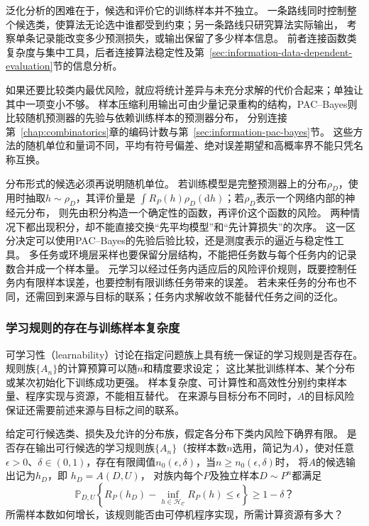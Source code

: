 泛化分析的困难在于，候选和评价它的训练样本并不独立。
一条路线同时控制整个候选类，使算法无论选中谁都受到约束；另一条路线只研究算法实际输出，
考察单条记录能改变多少预测损失，或输出保留了多少样本信息。
前者连接函数类复杂度与集中工具，后者连接算法稳定性及第~\ref{sec:information-data-dependent-evaluation}节的信息分析。

如果还要比较类内最优风险，就应将统计差异与未充分求解的代价合起来；单独让其中一项变小不够。
样本压缩利用输出可由少量记录重构的结构，PAC--Bayes则比较随机预测器的先验与依赖训练样本的预测器分布，
分别连接第~\ref{chap:combinatorics}章的编码计数与第~\ref{sec:information-pac-bayes}节。
这些方法的随机单位和量词不同，平均有符号偏差、绝对误差期望和高概率界不能只凭名称互换。

分布形式的候选必须再说明随机单位。
若训练模型是完整预测器上的分布$\rho_D$，使用时抽取$h\sim\rho_D$，其评价量是
$\int R_P(h)\rho_D(\mathrm dh)$；若$\rho_D$表示一个网络内部的神经元分布，
则先由积分构造一个确定性的函数，再评价这个函数的风险。
两种情况下都出现积分，却不能直接交换“先平均模型”和“先计算损失”的次序。
这一区分决定可以使用PAC--Bayes的先验后验比较，还是测度表示的逼近与稳定性工具。
多任务或环境层采样也要保留分层结构，不能把任务数与每个任务内的记录数合并成一个样本量。
元学习以经过任务内适应后的风险评价规则，既要控制任务内有限样本误差，也要控制有限训练任务带来的误差。
若未来任务的分布也不同，还需回到来源与目标的联系；任务内求解收敛不能替代任务之间的泛化。

\subsubsection{学习规则的存在与训练样本复杂度}
\label{sec:future-analysis-learnability}

可学习性（learnability）讨论在指定问题族上具有统一保证的学习规则是否存在。
规则族$\{A_n\}$的计算预算可以随$n$和精度要求设定；
这比某批训练样本、某个分布或某次初始化下训练成功更强。
样本复杂度、可计算性和高效性分别约束样本量、程序实现与资源，不能相互替代。
在来源与目标分布不同时，$A$的目标风险保证还需要前述来源与目标之间的联系。

\begin{mathproblem}[具有统一保证的学习规则是否存在]
  \label{question:future-learnability}
  给定可行候选类、损失及允许的分布族，假定各分布下类内风险下确界有限。
  是否存在输出可行候选的学习规则族$\{A_n\}$（按样本数$n$选用，简记为$A$），使对任意
  $\epsilon>0$、$\delta\in(0,1)$，存在有限阈值$n_0(\epsilon,\delta)$，当$n\geq n_0(\epsilon,\delta)$时，
  将$A$的候选输出记为$h_D$，即
  $h_D=A(D,U)$，
  对族内每个$P$及独立样本$D\sim P^n$都满足
  \[
    \mathbb P_{D,U}\!\left\{
      R_P(h_D)-\inf_{h\in\mathcal H_{\mathcal C}}R_P(h)
      \leq\epsilon
    \right\}\geq1-\delta\text{？}
  \]
  所需样本数如何增长，该规则能否由可停机程序实现，所需计算资源有多大？
\end{mathproblem}

